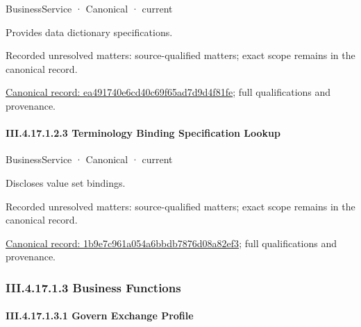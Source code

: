 \label{element:ea491740e6cd40c69f65ad7d9d4f81fe}
{\small BusinessService · Canonical · current}\par

Provides data dictionary specifications.


{\small Recorded unresolved matters: source-qualified matters; exact scope remains in the canonical record.}\par
{\footnotesize \href{../../../../../../../../continuum/business/business-service/ea491740e6cd40c69f65ad7d9d4f81fe.md}{Canonical record: ea491740e6cd40c69f65ad7d9d4f81fe}; full qualifications and provenance.}\par
\paragraph*{III.4.17.1.2.3 Terminology Binding Specification Lookup}
\label{navigation:III.4.17.1.2.3}

\label{element:1b9e7c961a054a6bbdb7876d08a82ef3}
{\small BusinessService · Canonical · current}\par

Discloses value set bindings.


{\small Recorded unresolved matters: source-qualified matters; exact scope remains in the canonical record.}\par
{\footnotesize \href{../../../../../../../../continuum/business/business-service/1b9e7c961a054a6bbdb7876d08a82ef3.md}{Canonical record: 1b9e7c961a054a6bbdb7876d08a82ef3}; full qualifications and provenance.}\par
\subsubsection*{III.4.17.1.3 Business Functions}
\label{navigation:III.4.17.1.3}

\paragraph*{III.4.17.1.3.1 Govern Exchange Profile}
\label{navigation:III.4.17.1.3.1}


